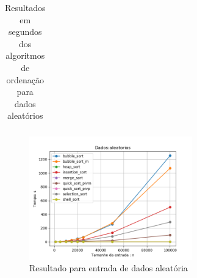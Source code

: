 \documentclass[10pt,a4paper]{article}
\begin{document}
\begin{center}
\begin{table}[H]
\begin{tabular}{l*{9}{c}r}
                    \hline
                \end{tabular}
                \caption{Resultados em segundos dos algoritmos de ordenação para dados aleatórios}
            \end{table}
            \begin{figure}[H]
                \centering
                \includegraphics[width=0.63\textwidth]{Resultados/Graficos/aleatorios.png}
                \caption{Resultado para entrada de dados aleatória}
            \end{figure}
        \end{center}
    
\end{document}
